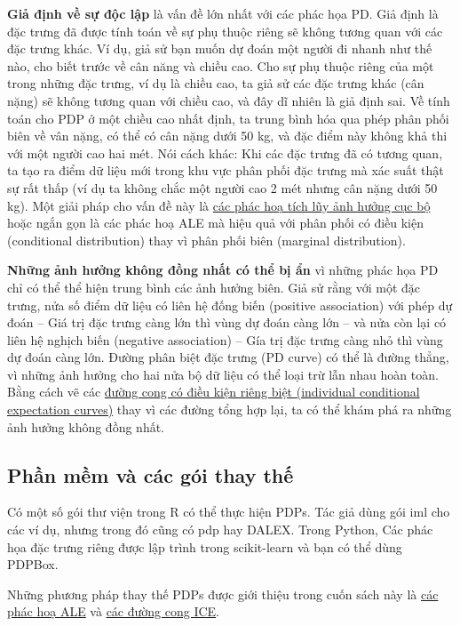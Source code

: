 \textbf{Giả định về sự độc lập} là vấn đề lớn nhất với các phác họa PD. Giả định là đặc trưng đã được tính toán về sự phụ thuộc riêng sẽ không tương quan với các đặc trưng khác. Ví dụ, giả sử bạn muốn dự đoán một người đi nhanh như thế nào, cho biết trước về cân năng và chiều cao. Cho sự phụ thuộc riêng của một trong những đặc trưng, ví dụ là chiều cao, ta giả sử các đặc trưng khác (cân nặng) sẽ không tương quan với chiều cao, và đây dĩ nhiên là giả định sai. Về tính toán cho PDP ở một chiều cao nhất định, ta trung bình hóa qua phép phân phối biên về vân nặng, có thể có cân nặng dưới 50 kg, và đặc điểm này không khả thi với một người cao hai mét. Nói cách khác: Khi các đặc trưng đã có tương quan, ta tạo ra điểm dữ liệu mới trong khu vực phân phối đặc trưng mà xác suất thật sự rất thấp (ví dụ ta không chắc một người cao 2 mét nhưng cân nặng dưới 50 kg). Một giải pháp cho vấn đề này là \href{Chap_5.3}{các phác hoạ tích lũy ảnh hưởng cục bộ} hoặc ngắn gọn là các phác hoạ ALE mà hiệu quả với phân phối có điều kiện (conditional distribution) thay vì phân phối biên (marginal distribution).

\textbf{Những ảnh hưởng không đồng nhất có thể bị ẩn} vì những phác họa PD chỉ có thể thể hiện trung bình các ảnh hưởng biên. Giả sử rằng với một đặc trưng, nửa số điểm dữ liệu có liên hệ đống biến (positive association) với phép dự đoán – Giá trị đặc trưng càng lớn thì vùng dự đoán càng lớn – và nửa còn lại có liên hệ nghịch biến (negative association) --  Gía trị đặc trưng càng nhỏ thì vùng dự đoán càng lớn. Đường phân biệt đặc trưng (PD curve) có thể là đường thẳng, vì những ảnh hưởng cho hai nửa bộ dữ liệu có thể loại trừ lẫn nhau hoàn toàn. Bằng cách vẽ các \href{Chap_5.2}{đường cong có điều kiện riêng biệt (individual conditional expectation curves)} thay vì các đường tổng hợp lại, ta có thể khám phá ra những ảnh hưởng không đồng nhất.

\subsection{Phần mềm và các gói thay thế}
Có một số gói thư viện trong R có thể thực hiện PDPs. Tác giả dùng gói iml cho các ví dụ, nhưng trong đó cũng có pdp hay DALEX. Trong Python, Các phác họa đặc trưng riêng được lập trình trong scikit-learn và bạn có thể dùng PDPBox.

Những phương pháp thay thế PDPs được giới thiệu trong cuốn sách này là \href{Chap_5.3}{các phác hoạ ALE} và \href{Chap_5.2}{các đường cong ICE}.



